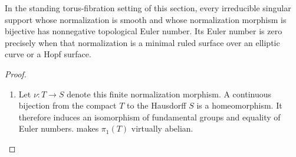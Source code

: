 \begin{proposition}\hypertarget{tag-02YD}{}\label{night:P4R.2}\label{stmt:P4R.2}

In the standing torus-fibration setting of this section, every irreducible singular support
whose normalization is smooth and whose normalization morphism
is bijective has nonnegative topological Euler number.
Its Euler number is zero precisely when that normalization is
a minimal ruled surface over an elliptic curve or a Hopf surface.
\end{proposition}
\begin{proof}

\begin{enumerate}[label={$\langle1\rangle$\arabic*.},leftmargin=*]
\item Let $\nu:T\to S$ denote this finite normalization morphism.
A continuous bijection from the compact $T$ to the Hausdorff
$S$ is a homeomorphism. It therefore induces an isomorphism
of fundamental groups and equality of Euler numbers.
 makes $\pi_1(T)$ virtually abelian.


\end{enumerate}
\end{proof}
